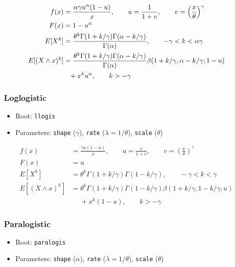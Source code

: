 \documentclass[x11names]{article}
\newcommand{\E}[1]{E[ #1 ]}
\newcommand{\code}[1]{\texttt{#1}}
\begin{document}
\begin{align*}
  f(x)
  &= \frac{\alpha \gamma u^\alpha (1 - u)}{x},
    \qquad u = \frac{1}{1 + v},
    \qquad v = \left( \frac{x}{\theta} \right)^\gamma \\
  F(x)
  &= 1 - u^\alpha \\
  \E{X^k}
  &= \frac{%
    \theta^k \Gamma(1+k/\gamma) \Gamma(\alpha-k/\gamma)}{%
    \Gamma(\alpha)},
    \qquad -\gamma < k < \alpha\gamma \\
  \E{(X \wedge x)^k}
  &= \frac{%
    \theta^k \Gamma(1+k/\gamma) \Gamma(\alpha-k/\gamma)}{%
    \Gamma(\alpha)}
    \beta(1+k/\gamma, \alpha-k/\gamma; 1-u) \\
  &\phantom{=} + x^k u^\alpha,
    \qquad k > -\gamma
\end{align*}

\subsubsection*{Loglogistic}

\begin{itemize}
\item Root: \code{llogis}
\item Parameters: \code{shape} ($\gamma$),
      \code{rate}   ($\lambda = 1/\theta$),
      \code{scale}  ($\theta$)
\end{itemize}

\begin{align*}
  f(x)
  &= \frac{\gamma u (1 - u)}{x},
    \qquad u = \frac{v}{1 + v},
    \qquad v = \left( \frac{x}{\theta} \right)^\gamma \\
  F(x)
  &= u \\
  \E{X^k}
  &= \theta^k \Gamma(1+k/\gamma) \Gamma(1-k/\gamma),
    \qquad -\gamma < k < \gamma \\
  \E{(X \wedge x)^k}
  &= \theta^k \Gamma(1+k/\gamma) \Gamma(1-k/\gamma)
    \beta(1+k/\gamma, 1-k/\gamma; u) \\
  &\phantom{=} + x^k (1 - u),
    \qquad k > -\gamma
\end{align*}

\subsubsection*{Paralogistic}

\begin{itemize}
\item Root: \code{paralogis}
\item Parameters: \code{shape} ($\alpha$),
      \code{rate}   ($\lambda = 1/\theta$),
      \code{scale}  ($\theta$)
\end{itemize}
\end{document}
